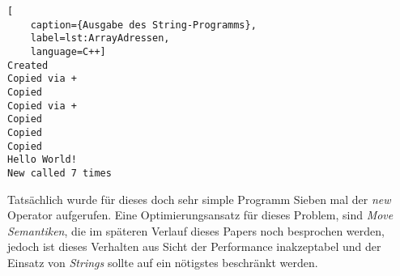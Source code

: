 \begin{lstlisting}[
    caption={Ausgabe des String-Programms},
    label=lst:ArrayAdressen,
    language=C++]
Created
Copied via +
Copied
Copied via +
Copied
Copied
Copied
Hello World!
New called 7 times
\end{lstlisting}

Tatsächlich wurde für dieses doch sehr simple Programm Sieben mal der \emph{new} Operator
aufgerufen. Eine Optimierungsansatz für dieses Problem, sind \emph{Move Semantiken}, die im
späteren Verlauf dieses Papers noch besprochen werden, jedoch ist dieses Verhalten aus Sicht der
Performance inakzeptabel und der Einsatz von \emph{Strings} sollte auf ein nötigstes beschränkt
werden.
